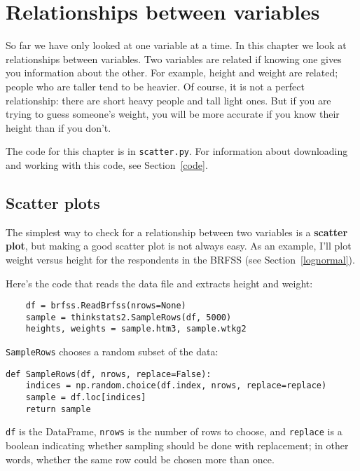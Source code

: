 \documentclass[12pt]{book}
\begin{document}
\chapter{Relationships between variables}

So far we have only looked at one variable at a time.  In this
chapter we look at relationships between variables.  Two variables are
related if knowing one gives you information about the other.  For
example, height and weight are related; people who are taller tend to
be heavier.  Of course, it is not a perfect relationship: there
are short heavy people and tall light ones.  But if you are
trying to guess someone's weight, you will be more accurate if you
know their height than if you don't.

The code for this chapter is in {\tt scatter.py}.
For information about downloading and
working with this code, see Section~\ref{code}.


\section{Scatter plots}

The simplest way to check for a relationship between two variables
is a {\bf scatter plot}, but making a good scatter plot is not always easy.
As an example, I'll plot weight versus height for the respondents
in the BRFSS (see Section~\ref{lognormal}).

Here's the code that reads the data file and extracts height and
weight:

\begin{verbatim}
    df = brfss.ReadBrfss(nrows=None)
    sample = thinkstats2.SampleRows(df, 5000)
    heights, weights = sample.htm3, sample.wtkg2
\end{verbatim}

{\tt SampleRows} chooses a random subset of the data:

\begin{verbatim}
def SampleRows(df, nrows, replace=False):
    indices = np.random.choice(df.index, nrows, replace=replace)
    sample = df.loc[indices]
    return sample
\end{verbatim}

{\tt df} is the DataFrame, {\tt nrows} is the number of rows to choose,
and {\tt replace} is a boolean indicating whether sampling should be
done with replacement; in other words, whether the same row could be
chosen more than once.
\end{document}
